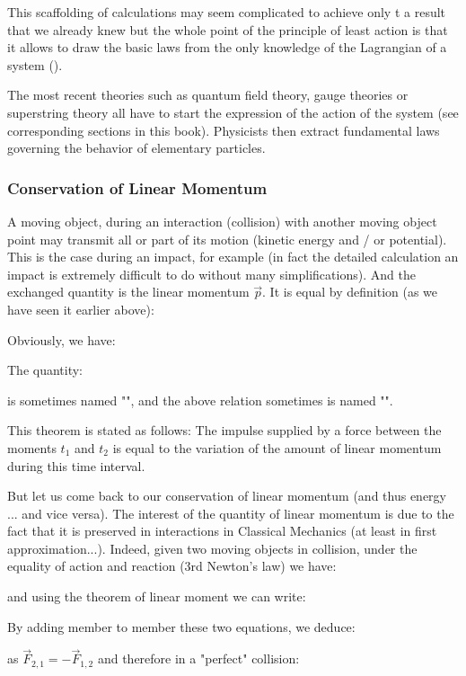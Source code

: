 	This scaffolding of calculations may seem complicated to achieve only t a result that we already knew  but the whole point of the principle of least action is that it allows to draw the basic laws from the only knowledge of the Lagrangian of a system ().

	The most recent theories such as quantum field theory, gauge theories or superstring theory all have to start the expression of the action of the system (see corresponding sections in this book). Physicists then extract fundamental laws governing the behavior of elementary particles.
	
	\pagebreak	
	\subsubsection{Conservation of Linear Momentum}
	A moving object, during an interaction (collision) with another moving object point may transmit all or part of its motion (kinetic energy and / or potential). This is the case during an impact, for example (in fact the detailed calculation an impact  is extremely difficult to do without many simplifications). And the exchanged quantity is the linear momentum $\vec{p}$. It is equal by definition (as we have seen it earlier above):
	
	Obviously, we have:
	
	The quantity:
	
	is sometimes named "", and the above relation sometimes is named "".
	
	This theorem is stated as follows: The impulse supplied by a force between the moments $t_1$ and $t_2$ is equal to the variation of the amount of linear momentum during this time interval.

	But let us come back to our conservation of linear momentum (and thus energy ... and vice versa). The interest of the quantity of linear momentum  is due to the fact that it is preserved in interactions in Classical Mechanics (at least in first approximation...). Indeed, given two moving objects in collision, under the equality of action and reaction (3rd Newton's law) we have:
	
	and using the theorem of linear moment we can write:
	
	By adding member to member these two equations, we deduce:
	
	as $\vec{F}_{2,1}=-\vec{F}_{1,2}$ and therefore in a "perfect" collision:
	
